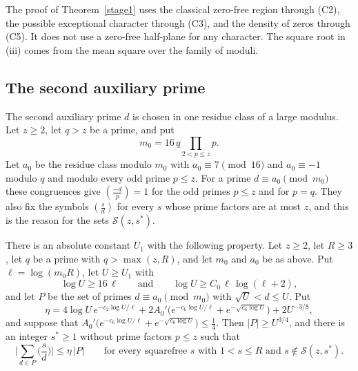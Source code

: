 The proof of Theorem~\ref{stage1} uses the classical zero-free region through (C2), the possible exceptional character through (C3), and the density of zeros through (C5). It does not use a zero-free half-plane for any character. The square root in (iii) comes from the mean square over the family of moduli.

\subsection{The second auxiliary prime}\label{sec:stage2}

The second auxiliary prime $d$ is chosen in one residue class of a large modulus. Let $z\ge2$, let $q>z$ be a prime, and put
\[
m_0=16\,q\prod_{2<p\le z}p .
\]
Let $a_0$ be the residue class modulo $m_0$ with $a_0\equiv7\pmod{16}$ and $a_0\equiv-1$ modulo $q$ and modulo every odd prime $p\le z$. For a prime $d\equiv a_0\pmod{m_0}$ these congruences give $(\frac{-d}p)=1$ for the odd primes $p\le z$ and for $p=q$. They also fix the symbols $(\frac sd)$ for every $s$ whose prime factors are at most $z$, and this is the reason for the sets $\mathcal S(z,s^\ast)$.

\begin{proposition}\label{legendre2}
There is an absolute constant $U_1$ with the following property. Let $z\ge2$, let $R\ge3$, let $q$ be a prime with $q>\max(z,R)$, and let $m_0$ and $a_0$ be as above. Put $\ell=\log(m_0R)$, let $U\ge U_1$ with
\[
\log U\ge16\,\ell\qquad\text{and}\qquad\log U\ge C_0\,\ell\,\log(\ell+2),
\]
and let $P$ be the set of primes $d\equiv a_0\pmod{m_0}$ with $\sqrt U<d\le U$. Put
\[
\eta=4\log U\,e^{-c_2\log U/\ell}+2A_0'\Big(e^{-c_6\log U/\ell}+e^{-\sqrt{c_6\log U}}\Big)+2U^{-3/8},
\]
and suppose that $A_0'\big(e^{-c_6\log U/\ell}+e^{-\sqrt{c_6\log U}}\big)\le\frac14$. Then $\lvert P\rvert\ge U^{3/4}$, and there is an integer $s^\ast\ge1$ without prime factors $p\le z$ such that
\[
\Big\lvert\sum_{d\in P}\Big(\frac sd\Big)\Big\rvert\le\eta\,\lvert P\rvert\qquad\text{for every squarefree }s\text{ with }1<s\le R\text{ and }s\notin\mathcal S(z,s^\ast).
\]
\end{proposition}

